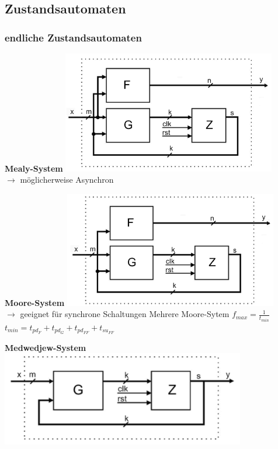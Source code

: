 \subsection{Zustandsautomaten}
\subsubsection{endliche Zustandsautomaten}
	\begin{minipage}[t]{6cm}
		\textbf{Mealy-System}
		\includegraphics[width=0.7\textwidth]{pics/statemachine/mealy}\\
		$\rightarrow$ möglicherweise Asynchron
	\end{minipage}
	\begin{minipage}[t]{6cm}
		\textbf{Moore-System}
		\includegraphics[width=0.7\textwidth]{pics/statemachine/moore}\\
		$\rightarrow$ geeignet für synchrone Schaltungen
		Mehrere Moore-Sytem $f_{max} = \frac{1}{t_{min}}$\\ 
		$t_{min} = t_{pd_F} + t_{pd_G} + t_{pd_{FF}} + t_{su_{FF}}$
	\end{minipage}
	\begin{minipage}[t]{6cm}
		\textbf{Medwedjew-System}
		\includegraphics[width=0.8\textwidth]{pics/statemachine/medwedjew}
	\end{minipage}

